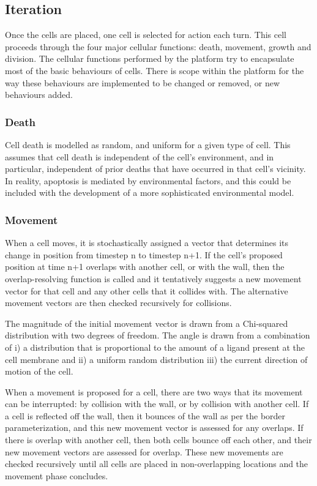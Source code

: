 \documentclass[11.5pt]{article}
\begin{document}
\subsection{Iteration}
Once the cells are placed, one cell is selected for action each turn. 
This cell proceeds through the four major cellular functions: death, 
movement, growth and division. The cellular functions performed by the 
platform try to encapsulate most of the basic behaviours of cells. There 
is scope within the platform for the way these behaviours are 
implemented to be changed or removed, or new behaviours added.

\subsubsection{Death}

Cell death is modelled as random, and uniform for a given type of cell. 
This assumes that cell death is independent of the cell's environment, 
and in particular, independent of prior deaths that have occurred in 
that cell's vicinity. In reality, apoptosis is mediated by environmental 
factors, and this could be included with the development of a more 
sophisticated environmental model.

\subsubsection{Movement}

When a cell moves, it is stochastically assigned a vector that 
determines its change in position from timestep n to timestep n+1. If 
the cell's proposed position at time n+1 overlaps with another cell, or 
with the wall, then the overlap-resolving function is called and it 
tentatively suggests a new movement vector for that cell and any other 
cells that it collides with. The alternative movement vectors are then 
checked recursively for collisions.

The magnitude of the initial movement vector is drawn from a Chi-squared 
distribution with two degrees of freedom. The angle is drawn from a 
combination of i) a distribution that is proportional to the amount of a 
ligand present at the cell membrane and ii) a uniform random 
distribution iii) the current direction of motion of the cell.

When a movement is proposed for a cell, there are two ways that its 
movement can be interrupted: by collision with the wall, or by collision 
with another cell. If a cell is reflected off the wall, then it bounces 
of the wall as per the border parameterization, and this new movement 
vector is assessed for any overlaps. If there is overlap with another 
cell, then both cells bounce off each other, and their new movement 
vectors are assessed for overlap. These new movements are checked 
recursively until all cells are placed in non-overlapping locations and 
the movement phase concludes.
\end{document}
